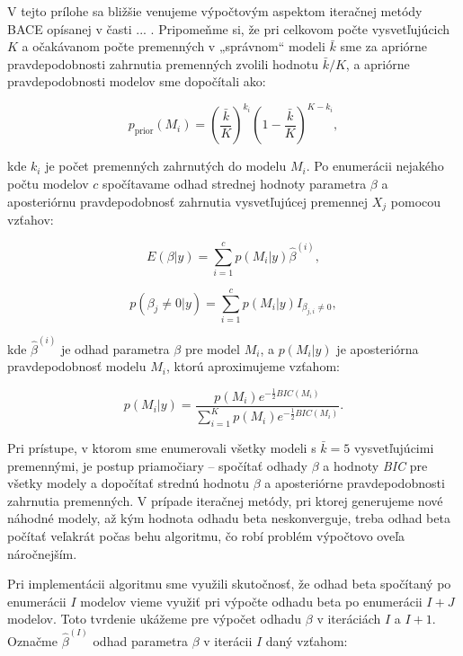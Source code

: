 V tejto prílohe sa bližšie venujeme výpočtovým aspektom iteračnej metódy BACE opísanej v časti ... .
Pripomeňme si, že pri celkovom počte vysvetľujúcich \(K\) a očakávanom počte premenných v „správnom“ modeli \(\bar{k}\)
sme za apriórne pravdepodobnosti zahrnutia premenných zvolili hodnotu \(\bar{k}/K\), a apriórne pravdepodobnosti modelov sme dopočítali ako:

\[
p_{\text{prior}}(M_i) = \left( \frac{\bar{k}}{K} \right)^{k_i} \left( 1 - \frac{\bar{k}}{K} \right)^{K - k_i},
\]

kde \( k_i \) je počet premenných zahrnutých do modelu \( M_i \).
Po enumerácii nejakého počtu modelov \(c\) spočítavame odhad strednej hodnoty parametra \(\beta\) a aposteriórnu pravdepodobnosť zahrnutia vysvetľujúcej premennej \(X_j\) pomocou vzťahov:

\[
    E(\beta | y) = \sum_{i = 1}^{c} p(M_i | y) \hat{\beta}^{(i)},
\]

\[
    p(\beta_j \neq 0 | y) = \sum_{i = 1}^{c} p(M_i | y) I_{\beta_{j, i} \neq 0},
\]

kde \(\hat{\beta}^{(i)}\) je odhad parametra \(\beta\) pre model \(M_i\), a \(p(M_i | y)\) je aposteriórna pravdepodobnosť modelu \(M_i\), ktorú aproximujeme vzťahom:

\[
    p(M_i | y) = \frac{p(M_i) e^{-\frac{1}{2}BIC(M_i)}}{\sum_{i = 1}^{K} p(M_i) e^{-\frac{1}{2}BIC(M_i)}}.
\]

Pri prístupe, v ktorom sme enumerovali všetky modeli s \(\bar{k} = 5\) vysvetľujúcimi premennými, je postup priamočiary –
spočítať odhady \(\beta\) a hodnoty \emph{BIC} pre všetky modely a dopočítať strednú hodnotu \(\beta\) a aposteriórne pravdepodobnosti zahrnutia premenných.
V prípade iteračnej metódy, pri ktorej generujeme nové náhodné modely, až kým hodnota odhadu beta neskonverguje,
treba odhad beta počítať veľakrát počas behu algoritmu, čo robí problém výpočtovo oveľa náročnejším.

Pri implementácii algoritmu sme využili skutočnosť, že odhad beta spočítaný po enumerácii \(I\) modelov vieme využiť pri výpočte odhadu beta po enumerácii \(I + J\) modelov.
Toto tvrdenie ukážeme pre výpočet odhadu \(\beta\) v iteráciách \(I\) a \(I + 1\).
Označme \(\hat{\beta}^{(I)}\) odhad parametra \(\beta\) v iterácii \(I\) daný vzťahom:


